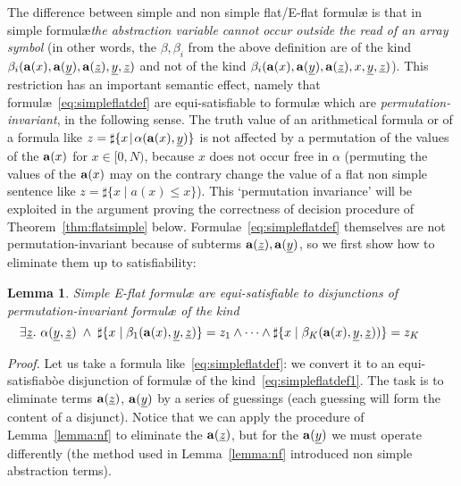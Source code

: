 \documentclass[11pt,a4paper]{article}
\newcommand{\formulae}{formul\ae\xspace}
\newcommand{\uy}{\ensuremath{\underline y}}
\newcommand{\uz}{\ensuremath{\underline z}}
\newcommand{\ta}{\ensuremath{{\bf a}}\xspace}
\newtheorem{lemma}{Lemma}
\begin{document}
The difference between simple and non simple
flat/E-flat \formulae is that in simple \formulae \emph{the abstraction variable cannot occur outside the read of an array symbol} (in other words,  the $\beta,\beta_i$ from the
above definition are of the kind $\beta_i(\ta(x),\ta(\uy), \ta(\uz), \uy,\uz)$ and not of the kind $\beta_i(\ta(x),\ta(\uy), \ta(\uz),x, \uy,\uz)$).
This restriction has an important semantic effect, namely that \formulae~\eqref{eq:simpleflatdef} are equi-satisfiable to \formulae which are \emph{permutation-invariant}, in the following sense. The truth
value of an arithmetical formula or of a formula like $z=\sharp\{x\!\mid\! \alpha(\ta(x),\uy)\}$ is not affected by a permutation of the values of the $\ta(x)$ for $x\in [0, N)$, because 
$x$ does not occur free in $\alpha$ (permuting the values of the $\ta(x)$ may on the contrary change the value of a flat non simple sentence like 
$z=\sharp\{x\!\mid\! a(x)\leq x\}$). This `permutation invariance' will be exploited in the argument proving the correctness of decision procedure  of Theorem~\ref{thm:flatsimple} below. 
Formulae~\eqref{eq:simpleflatdef} 
themselves 
are not permutation-invariant because of 
subterms $\ta(\uz), \ta(\uy)$, so we first show how to eliminate them up to satisfiability:



\begin{lemma}
 Simple E-flat \formulae are equi-satisfiable to disjunctions of per\-mu\-ta\-tion-invariant \formulae of the kind
  \begin{equation}\label{eq:simpleflatdef1}
   \exists \uz.~\alpha(\uy, \uz)\; \wedge \;\sharp\{x\mid \beta_1(\ta(x), \uy,\uz)\} =z_1 \wedge 
   \cdots\wedge \sharp\{x\mid \beta_K(\ta(x), \uy,\uz))\} =z_K~~~~~~
\end{equation}
\end{lemma}


\noindent
\textit{Proof.} Let us take a formula like~\eqref{eq:simpleflatdef}: we convert it to an equi-satisfiabòe disjunction of \formulae of the kind~\eqref{eq:simpleflatdef1}. The task is to eliminate terms $\ta(\uz)$, $\ta(\uy)$ by a series of guessings (each guessing will form the content
of a disjunct). Notice that
 we can apply the procedure of Lemma~\ref{lemma:nf} to eliminate the $\ta(\uz)$, but for the $\ta(\uy)$ we must operate differently (the method used  in Lemma~\ref{lemma:nf} introduced non simple abstraction terms). 
 
\end{document}
